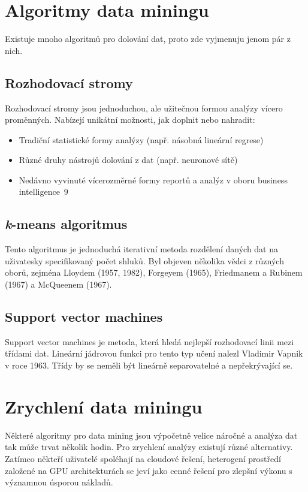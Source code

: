 \documentclass[12pt,a4paper]{article}
\begin{document}
	\section{Algoritmy data miningu}
	Existuje mnoho algoritmů pro dolování dat, proto zde vyjmenuju jenom pár z nich.
	
	\subsection{Rozhodovací stromy}
	Rozhodovací stromy jsou jednoduchou, ale užitečnou formou analýzy vícero proměnných. Nabízejí unikátní možnosti, jak doplnit nebo nahradit:
	\begin{itemize}
		\item Tradiční statistické formy analýzy (např. násobná lineární regrese)
		\item Různé druhy nástrojů dolování z dat (např. neuronové sítě)
		\item Nedávno vyvinuté vícerozměrné formy reportů a analýz v oboru business intelligence~9 \cite{Thesis:JaroslavFabian}
	\end{itemize}
	
	\subsection{\emph{k}-means algoritmus}
	Tento algoritmus je jednoduchá iterativní metoda rozdělení daných dat na uživatesky specifikovaný počet shluků. Byl objeven několika vědci z různých oborů, zejména Lloydem (1957, 1982), Forgeyem (1965), Friedmanem a Rubinem (1967) a McQueenem (1967). \cite{Online:Top10Algorithms}
	
	\subsection{Support vector machines}
	Support vector machines je metoda, která hledá nejlepší rozhodovací linii mezi třídami dat. Lineární jádrovou funkci pro tento typ učení nalezl Vladimir Vapnik v roce 1963. Třídy by se neměli být lineárně separovatelné a nepřekrývající se. \cite{Thesis:JosefHricko}
	
	\section{Zrychlení data miningu}
	Některé algoritmy pro data mining jsou výpočetně velice náročné a analýza dat tak může trvat několik hodin. Pro zrychlení analýzy existují různé alternativy. Zatímco někteří uživatelé spoléhají na cloudové řešení, heterogení prostředí založené na GPU architekturách se jeví jako cenné řešení pro zlepšní výkonu s významnou úsporou nákladů. \cite{Conference:GPUAcceleration}
	
	\newpage
	
	
\end{document}
